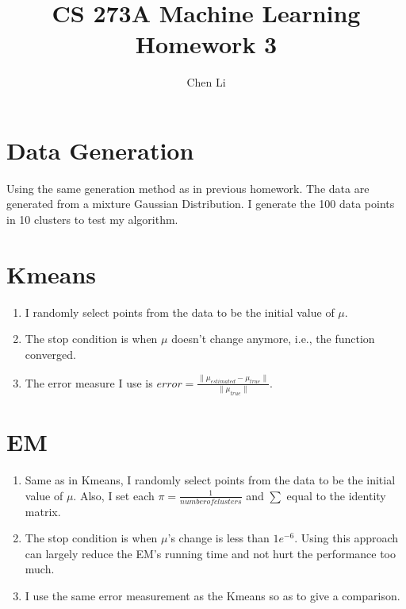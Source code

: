 \documentclass[11pt]{article}
\title{CS 273A Machine Learning Homework 3}
\author{Chen Li}
\begin{document}
\maketitle
\section {Data Generation}
Using the same generation method as in previous homework. The data are generated from a mixture Gaussian Distribution. I generate the 100 data points in 10 clusters to test my algorithm.
\section{Kmeans} 
\begin{enumerate}
\item I randomly select points from the data to be the initial value of $\mu$.
\item The stop condition is when $\mu$ doesn't change anymore, i.e., the function converged.
\item The error measure I use is $error = \frac{\lVert \mu_{estimated} - \mu_{true}\rVert}{\lVert \mu_{true} \rVert}$.
\end{enumerate}
\section{EM}
\begin{enumerate}
\item Same as in Kmeans, I randomly select points from the data to be the initial value of $\mu$. Also, I set each $\pi = \frac{1}{number of clusters}$ and $\sum$ equal to the identity matrix.
\item The stop condition is when $\mu$'s change is less than $1e^{-6}$. Using this approach can largely reduce the EM's running time and not hurt the performance too much.
\item I use the same error measurement as the Kmeans so as to give a comparison.
\end{enumerate}
\end{document}
